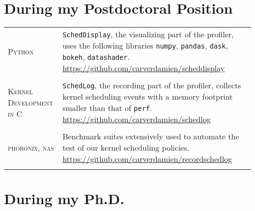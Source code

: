 \par{\bigskip\par}

\section{During my Postdoctoral Position}

\begin{tabular}{p{2cm}|p{11cm}}

\textsc{Python} & \texttt{SchedDisplay}, the visualizing part of the profiler, uses the following libraries \texttt{numpy}, \texttt{pandas}, \texttt{dask}, \texttt{bokeh}, \texttt{datashader}. \href{https://github.com/carverdamien/scheddisplay}{https://github.com/carverdamien/scheddisplay}\\
\multicolumn{2}{c}{} \\

\textsc{Kernel \newline Development in C} & \texttt{SchedLog}, the recording part of the profiler, collects kernel scheduling events with a memory footprint smaller than that of \texttt{perf}. \href{https://github.com/carverdamien/schedlog}{https://github.com/carverdamien/schedlog}\\
\multicolumn{2}{c}{} \\

\textsc{phoronix, nas} & Benchmark suites extensively used to automate the test of our kernel scheduling policies. \href{https://github.com/carverdamien/recordschedlog}{https://github.com/carverdamien/recordschedlog}\\
\multicolumn{2}{c}{} \\

\end{tabular}

\section{During my Ph.D.}

